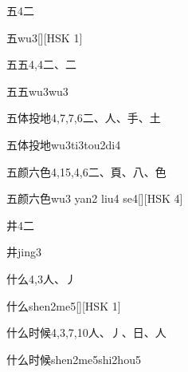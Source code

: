 \begin{entry}{五}{4}{⼆}
  \begin{phonetics}{五}{wu3}[][HSK 1]
  \end{phonetics}
\end{entry}

\begin{entry}{五五}{4,4}{⼆、⼆}
  \begin{phonetics}{五五}{wu3wu3}
  \end{phonetics}
\end{entry}

\begin{entry}{五体投地}{4,7,7,6}{⼆、⼈、⼿、⼟}
  \begin{phonetics}{五体投地}{wu3ti3tou2di4}
  \end{phonetics}
\end{entry}

\begin{entry}{五颜六色}{4,15,4,6}{⼆、⾴、⼋、⾊}
  \begin{phonetics}{五颜六色}{wu3 yan2 liu4 se4}[][HSK 4]
  \end{phonetics}
\end{entry}

\begin{entry}{井}{4}{⼆}
  \begin{phonetics}{井}{jing3}
  \end{phonetics}
\end{entry}

\begin{entry}{什么}{4,3}{⼈、⼃}
  \begin{phonetics}{什么}{shen2me5}[][HSK 1]
  \end{phonetics}
\end{entry}

\begin{entry}{什么时候}{4,3,7,10}{⼈、⼃、⽇、⼈}
  \begin{phonetics}{什么时候}{shen2me5shi2hou5}
  \end{phonetics}
\end{entry}


